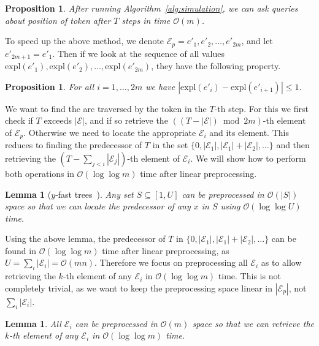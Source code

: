 \documentclass{article}[11pt,letter]
\newtheorem{lemma}[definition]{Lemma}
\newtheorem{proposition}[definition]{Proposition}
\newcommand{\bigo}{\mathcal{O}}
\newcommand{\expl}{\mathrm{expl}}
\newcommand{\walk}{\mathcal{E}}
\begin{document}
\begin{proposition}
After running Algorithm~\ref{alg:simulation}, we can ask queries about position of token after $T$ steps in time $\bigo(m)$.
\end{proposition}

To speed up the above method, we denote $\walk_p = e'_1,e'_2, \ldots, e'_{2m}$, and let $e'_{2m+1}=e'_1$.
Then if we look at the sequence
of all values $\expl(e'_1), \expl(e'_2), \ldots, \expl(e'_{2m})$, they have the following property.

\begin{proposition}
\label{prop:small changes}
For all $i=1,\ldots,2m$ we have $|\expl(e'_i)-\expl(e'_{i+1})|\leq 1$.
\end{proposition}

We want to find the arc traversed by the token in the $T$-th step. For this we first check if $T$ exceeds $|\walk|$, and if so retrieve
the $((T-|\walk|)\bmod 2m)$-th element of $\walk_p$. Otherwise we need to locate the appropriate $\walk_i$ and its element. This reduces to finding the predecessor
of $T$ in the set $\{0,|\walk_1|,|\walk_1|+|\walk_2|,\ldots\}$ and then retrieving the $(T-\sum_{j<i}|\walk_j|)$-th element of $\walk_i$. We will show how to perform both operations
in $\bigo(\log\log m)$ time after linear preprocessing.

\begin{lemma}[$y$-fast trees~\cite{Willard}]
\label{lemma:y fast}
Any set $S\subseteq [1,U]$ can be preprocessed in $\bigo(|S|)$ space so that we can locate the predecessor of any $x$ in $S$ using $\bigo(\log\log  U)$ time.
\end{lemma}

Using the above lemma, the predecessor of $T$ in $\{0,|\walk_1|,|\walk_1|+|\walk_2|,\ldots\}$ can be found in $\bigo(\log\log m)$ time after linear preprocessing, as $U=\sum_i|\walk_i| = \bigo(mn)$.
Therefore we focus on preprocessing all $\walk_i$ as to allow retrieving the $k$-th element of any $\walk_i$ in $\bigo(\log\log m)$ time. This is not completely trivial,
as we want to keep the preprocessing space linear in $|\walk_p|$, not $\sum_i |\walk_i|$.

\begin{lemma}
\label{lemma:query}
All $\walk_i$ can be preprocessed in $\bigo(m)$ space so that we can retrieve the $k$-th element of any $\walk_i$ in $\bigo(\log\log m)$ time.
\end{lemma}
\end{document}
